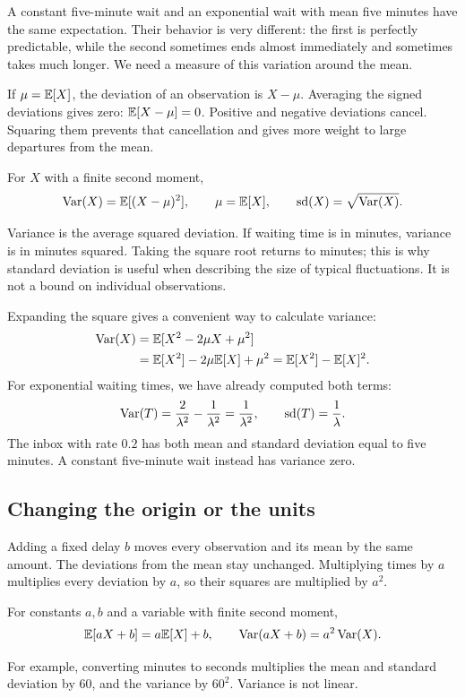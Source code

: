 A constant five-minute wait and an exponential wait with mean five minutes
have the same expectation. Their behavior is very different: the first
is perfectly predictable, while the second sometimes ends almost
immediately and sometimes takes much longer. We need a measure of this
variation around the mean.

If \(\mu=\mathbb{E}[X]\), the deviation of an observation is \(X-\mu\).
Averaging the signed deviations gives zero:
\(\mathbb{E}[X-\mu]=0\). Positive and negative deviations cancel.
Squaring them prevents that cancellation and gives more weight to large
departures from the mean.

\begin{definition}
For \(X\) with a finite second moment,
\[
  \operatorname{Var}(X)=\mathbb{E}[(X-\mu)^2],\qquad \mu=\mathbb{E}[X],
  \qquad
  \operatorname{sd}(X)=\sqrt{\operatorname{Var}(X)}.
\]
\end{definition}

Variance is the average squared deviation. If waiting time is in minutes,
variance is in minutes squared. Taking the square root returns to minutes;
this is why standard deviation is useful when describing the size of
typical fluctuations. It is not a bound on individual observations.

Expanding the square gives a convenient way to calculate variance:
\begin{align}
  \operatorname{Var}(X)
  &=\mathbb{E}[X^2-2\mu X+\mu^2]\notag\\
  &=\mathbb{E}[X^2]-2\mu\mathbb{E}[X]+\mu^2
   =\mathbb{E}[X^2]-\mathbb{E}[X]^2.
  \label{eq:variance-moments}
\end{align}
For exponential waiting times, we have already computed both terms:
\[
  \operatorname{Var}(T)=\frac2{\lambda^2}-\frac1{\lambda^2}
  =\frac1{\lambda^2},
  \qquad \operatorname{sd}(T)=\frac1\lambda.
\]
The inbox with rate \(0.2\) has both mean and standard deviation equal to
five minutes. A constant five-minute wait instead has variance zero.

\subsection{Changing the origin or the units}

Adding a fixed delay \(b\) moves every observation and its mean by the
same amount. The deviations from the mean stay unchanged.
Multiplying times by \(a\) multiplies every deviation by \(a\), so their
squares are multiplied by \(a^2\).
\begin{result}
For constants \(a,b\) and a variable with finite second moment,
\[
  \mathbb{E}[aX+b]=a\mathbb{E}[X]+b,\qquad
  \operatorname{Var}(aX+b)=a^2\operatorname{Var}(X).
\]
\end{result}
For example, converting minutes to seconds multiplies the mean and
standard deviation by \(60\), and the variance by \(60^2\).
Variance is not linear.

